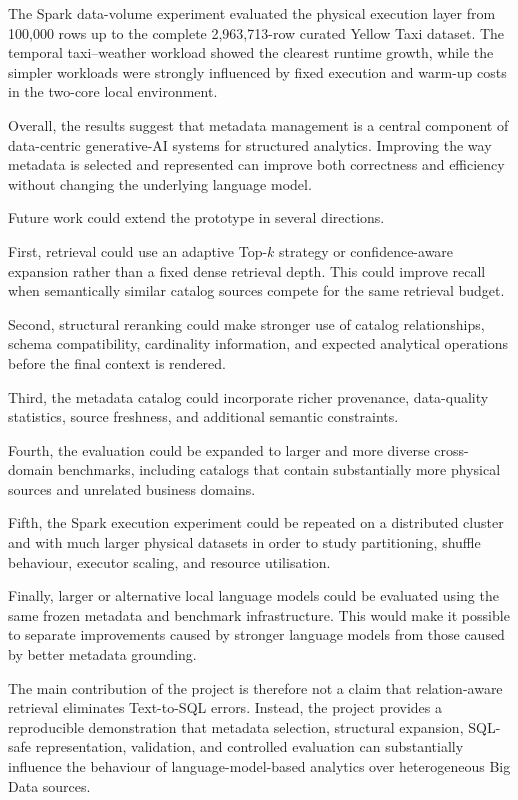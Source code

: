 The Spark data-volume experiment evaluated the physical execution layer from
100,000 rows up to the complete 2,963,713-row curated Yellow Taxi dataset.
The temporal taxi--weather workload showed the clearest runtime growth, while
the simpler workloads were strongly influenced by fixed execution and warm-up
costs in the two-core local environment.

Overall, the results suggest that metadata management is a central component
of data-centric generative-AI systems for structured analytics. Improving the
way metadata is selected and represented can improve both correctness and
efficiency without changing the underlying language model.

Future work could extend the prototype in several directions.

First, retrieval could use an adaptive Top-\(k\) strategy or confidence-aware
expansion rather than a fixed dense retrieval depth. This could improve recall
when semantically similar catalog sources compete for the same retrieval
budget.

Second, structural reranking could make stronger use of catalog relationships,
schema compatibility, cardinality information, and expected analytical
operations before the final context is rendered.

Third, the metadata catalog could incorporate richer provenance, data-quality
statistics, source freshness, and additional semantic constraints.

Fourth, the evaluation could be expanded to larger and more diverse
cross-domain benchmarks, including catalogs that contain substantially more
physical sources and unrelated business domains.

Fifth, the Spark execution experiment could be repeated on a distributed
cluster and with much larger physical datasets in order to study partitioning,
shuffle behaviour, executor scaling, and resource utilisation.

Finally, larger or alternative local language models could be evaluated using
the same frozen metadata and benchmark infrastructure. This would make it
possible to separate improvements caused by stronger language models from
those caused by better metadata grounding.

The main contribution of the project is therefore not a claim that
relation-aware retrieval eliminates Text-to-SQL errors. Instead, the project
provides a reproducible demonstration that metadata selection, structural
expansion, SQL-safe representation, validation, and controlled evaluation can
substantially influence the behaviour of language-model-based analytics over
heterogeneous Big Data sources.
